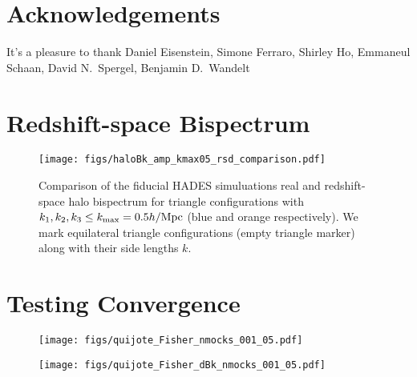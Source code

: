\documentclass[12pt, letterpaper, preprint]{aastex62}
\begin{document}
\section*{Acknowledgements}
It's a pleasure to thank 
    Daniel Eisenstein, 
    Simone Ferraro, 
    Shirley Ho, 
    Emmaneul Schaan, 
    David N.~Spergel, 
    Benjamin D.~Wandelt


\appendix
\section{Redshift-space Bispectrum} 
\begin{figure}
\begin{center}
    \texttt{[image: figs/haloBk\_amp\_kmax05\_rsd\_comparison.pdf]}
    \caption{Comparison of the fiducial HADES simuluations real and redshift-space halo
    bispectrum for triangle configurations with $k_1, k_2, k_3 \leq k_{\rm max} = 0.5 h/{\rm Mpc}$ 
    (blue and orange respectively). We mark equilateral triangle configurations (empty 
    triangle marker) along with their side lengths $k$.
    }
\label{fig:cov_converge}
\end{center}
\end{figure}

\section{Testing Convergence} 
\begin{figure}
\begin{center}
    \texttt{[image: figs/quijote\_Fisher\_nmocks\_001\_05.pdf]}
    \caption{}
\label{fig:cov_converge}
\end{center}
\end{figure}

\begin{figure}
\begin{center}
    \texttt{[image: figs/quijote\_Fisher\_dBk\_nmocks\_001\_05.pdf]} 
    \caption{}
\label{fig:dbk_converge}
\end{center}
\end{figure}


 
\end{document}
